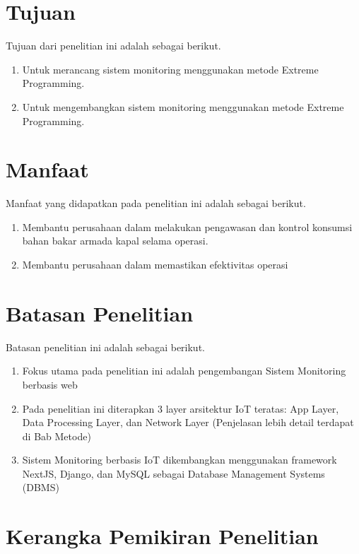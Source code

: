 \section{Tujuan}

\noindent Tujuan dari penelitian ini adalah sebagai berikut.

\begin{enumerate}
    \item Untuk merancang sistem monitoring menggunakan metode Extreme Programming.
    \item Untuk mengembangkan sistem monitoring menggunakan metode Extreme Programming.
\end{enumerate}

\section{Manfaat}

\noindent Manfaat yang didapatkan pada penelitian ini adalah sebagai berikut.

\begin{enumerate}
    \item Membantu perusahaan dalam melakukan pengawasan dan kontrol konsumsi bahan bakar armada kapal selama operasi.
    \item Membantu perusahaan dalam memastikan efektivitas operasi
\end{enumerate}


\section{Batasan Penelitian}

\noindent Batasan penelitian ini adalah sebagai berikut.

\begin{enumerate}
    \item Fokus utama pada penelitian ini adalah pengembangan Sistem Monitoring berbasis web
    \item Pada penelitian ini diterapkan 3 layer arsitektur IoT teratas: App Layer, Data Processing Layer, dan Network Layer (Penjelasan lebih detail terdapat di Bab Metode)
    \item Sistem Monitoring berbasis IoT dikembangkan menggunakan framework
    NextJS, Django, dan MySQL sebagai Database Management Systems (DBMS)
\end{enumerate}
\section{Kerangka Pemikiran Penelitian}


